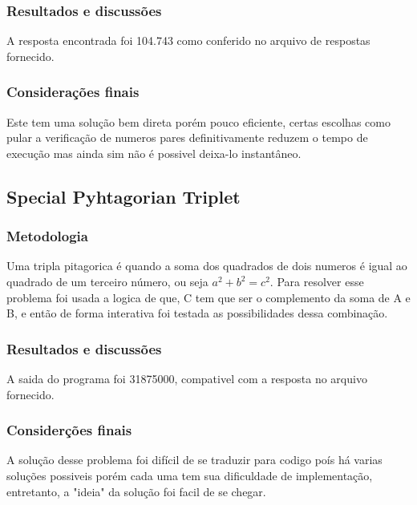 \documentclass{article}
\begin{document}
        \subsubsection{Resultados e discussões}
        
        A resposta encontrada foi 104.743 como conferido no arquivo de respostas fornecido.
        
        \subsubsection{Considerações finais}
        Este tem uma solução bem direta porém pouco eficiente, certas escolhas como pular a verificação de numeros pares definitivamente reduzem o tempo de execução mas ainda sim não é possivel deixa-lo instantâneo.
        
    \subsection{Special Pyhtagorian Triplet}
        
        \subsubsection{Metodologia}
        Uma tripla pitagorica é quando a soma dos quadrados de dois numeros é igual ao quadrado de um terceiro número, ou seja $a^2+b^2=c^2$. Para resolver esse problema foi usada a logica de que, C tem que ser o complemento da soma de A e B, e então de forma interativa foi testada as possibilidades dessa combinação.
        
        \subsubsection{Resultados e discussões}
        
        A saida do programa foi 31875000, compativel com a resposta no arquivo fornecido.
        
        \subsubsection{Considerções finais}
        A solução desse problema foi difícil de se traduzir para codigo poís há varias soluções possiveis porém cada uma tem sua dificuldade de implementação, entretanto, a "ideia" da solução foi facil de se chegar.
        
\end{document}
